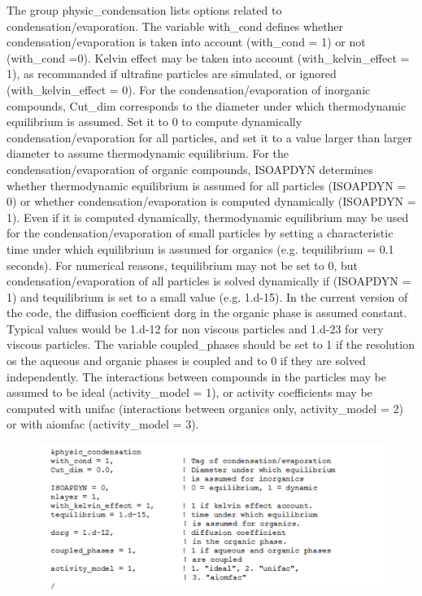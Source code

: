 \documentclass[a4paper,11pt]{article}
\begin{document}
The group physic\_condensation lists options related to condensation/evaporation. The variable with\_cond defines whether condensation/evaporation is taken into account (with\_cond = 1) or not (with\_cond =0). Kelvin effect may be taken into account (with\_kelvin\_effect = 1), as recommanded if ultrafine particles are simulated, or ignored (with\_kelvin\_effect = 0).
For the condensation/evaporation of inorganic compounds, Cut\_dim corresponds to the diameter under which thermodynamic equilibrium is assumed. Set it to 0 to compute dynamically condensation/evaporation for all particles, and set it to a value larger than larger diameter to assume thermodynamic equilibrium.
For the condensation/evaporation of organic compounds, ISOAPDYN determines whether thermodynamic equilibrium is assumed for all particles (ISOAPDYN = 0) or whether condensation/evaporation is computed dynamically (ISOAPDYN = 1). Even if it is computed dynamically, thermodynamic equilibrium may be used for the condensation/evaporation of small particles by setting a characteristic time under which equilibrium is assumed for organics (e.g. tequilibrium = 0.1 seconds). For numerical reasons, tequilibrium may not be set to 0, but condensation/evaporation of all particles is solved dynamically if (ISOAPDYN = 1) and tequilibrium is set to a small value (e.g. 1.d-15). In the current version of the code, the diffusion coefficient dorg in the organic phase is assumed constant. Typical values would be 1.d-12 for non viscous particles and 1.d-23 for very viscous particles. 
The variable coupled\_phases should be set to 1 if the resolution os the aqueous and organic phases is coupled and to 0 if they are solved independently. The interactions between compounds in the particles may be assumed to be ideal (activity\_model = 1), or activity coefficients may be computed with unifac (interactions between organics only, activity\_model = 2) or with aiomfac (activity\_model = 3).

\begin{figure}[H]
        \begin{center}
                \includegraphics[angle=0,width=\textwidth]{fig/condensation.png}
        \end{center}
\end{figure}
          
\end{document}
